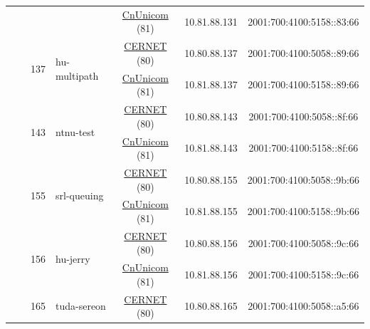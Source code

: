 \begin{small}
\begin{center}
\begin{longtable}{|c|c|c|c|c|c|c|c|}
  &  &  &  & \multicolumn{2}{|c|}{\tiny{\href{http://www.chinaunicom.com}{CnUnicom} (81)}} & \tiny{10.81.88.131} & \tiny{2001:700:4100:5158::83:66} \\* \cline{3-3}\cline{4-4}\cline{5-5}\cline{6-6}\cline{7-7}\cline{8-8}
  &  & \multirow{2}{*}{\tiny{137}} & \multicolumn{1}{|l|}{\multirow{2}{*}{\tiny{hu-multipath}}} & \multicolumn{2}{|c|}{\tiny{\href{http://www.cernet.edu.cn}{CERNET} (80)}} & \tiny{10.80.88.137} & \tiny{2001:700:4100:5058::89:66} \\* \cline{5-5}\cline{6-6}\cline{7-7}\cline{8-8}
  &  &  &  & \multicolumn{2}{|c|}{\tiny{\href{http://www.chinaunicom.com}{CnUnicom} (81)}} & \tiny{10.81.88.137} & \tiny{2001:700:4100:5158::89:66} \\* \cline{3-3}\cline{4-4}\cline{5-5}\cline{6-6}\cline{7-7}\cline{8-8}
  &  & \multirow{2}{*}{\tiny{143}} & \multicolumn{1}{|l|}{\multirow{2}{*}{\tiny{ntnu-test}}} & \multicolumn{2}{|c|}{\tiny{\href{http://www.cernet.edu.cn}{CERNET} (80)}} & \tiny{10.80.88.143} & \tiny{2001:700:4100:5058::8f:66} \\* \cline{5-5}\cline{6-6}\cline{7-7}\cline{8-8}
  &  &  &  & \multicolumn{2}{|c|}{\tiny{\href{http://www.chinaunicom.com}{CnUnicom} (81)}} & \tiny{10.81.88.143} & \tiny{2001:700:4100:5158::8f:66} \\* \cline{3-3}\cline{4-4}\cline{5-5}\cline{6-6}\cline{7-7}\cline{8-8}
  &  & \multirow{2}{*}{\tiny{155}} & \multicolumn{1}{|l|}{\multirow{2}{*}{\tiny{srl-queuing}}} & \multicolumn{2}{|c|}{\tiny{\href{http://www.cernet.edu.cn}{CERNET} (80)}} & \tiny{10.80.88.155} & \tiny{2001:700:4100:5058::9b:66} \\* \cline{5-5}\cline{6-6}\cline{7-7}\cline{8-8}
  &  &  &  & \multicolumn{2}{|c|}{\tiny{\href{http://www.chinaunicom.com}{CnUnicom} (81)}} & \tiny{10.81.88.155} & \tiny{2001:700:4100:5158::9b:66} \\* \cline{3-3}\cline{4-4}\cline{5-5}\cline{6-6}\cline{7-7}\cline{8-8}
  &  & \multirow{2}{*}{\tiny{156}} & \multicolumn{1}{|l|}{\multirow{2}{*}{\tiny{hu-jerry}}} & \multicolumn{2}{|c|}{\tiny{\href{http://www.cernet.edu.cn}{CERNET} (80)}} & \tiny{10.80.88.156} & \tiny{2001:700:4100:5058::9c:66} \\* \cline{5-5}\cline{6-6}\cline{7-7}\cline{8-8}
  &  &  &  & \multicolumn{2}{|c|}{\tiny{\href{http://www.chinaunicom.com}{CnUnicom} (81)}} & \tiny{10.81.88.156} & \tiny{2001:700:4100:5158::9c:66} \\* \cline{3-3}\cline{4-4}\cline{5-5}\cline{6-6}\cline{7-7}\cline{8-8}
  &  & \multirow{2}{*}{\tiny{165}} & \multicolumn{1}{|l|}{\multirow{2}{*}{\tiny{tuda-sereon}}} & \multicolumn{2}{|c|}{\tiny{\href{http://www.cernet.edu.cn}{CERNET} (80)}} & \tiny{10.80.88.165} & \tiny{2001:700:4100:5058::a5:66} \\* \cline{5-5}\cline{6-6}\cline{7-7}\cline{8-8}

\end{longtable}
\end{center}
\end{small}
